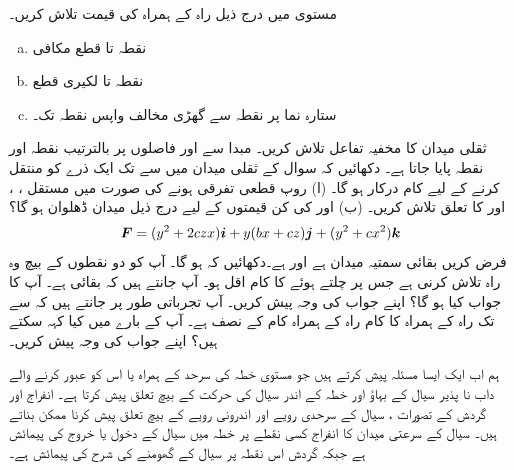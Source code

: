 مستوی  میں درج ذیل راہ  کے ہمراہ  کی قیمت تلاش کریں۔
\begin{enumerate}[a.]
\item
نقطہ  تا  قطع مکافی 
\item
نقطہ  تا  لکیری قطع
\item
ستارہ نما  پر نقطہ  سے گھڑی مخالف واپس نقطہ  تک۔
\end{enumerate}
ثقلی میدان  کا مخفیہ تفاعل تلاش کریں۔
مبدا سے  اور  فاصلوں پر بالترتیب نقطہ  اور  نقطہ  پایا جاتا ہے۔ دکھائیں کہ سوال  کے ثقلی میدان میں  سے  تک ایک ذرے کو منتقل کرنے کے لیے  کام درکار ہو گا۔
(ا) روپ  قطعی تفرقی ہونے کی صورت میں مستقل ،  ، اور    کا تعلق تلاش کریں۔ (ب)  اور  کی کن قیمتوں کے لیے درج ذیل  میدان ڈھلوان ہو گا؟
\[{{\boldsymbol{F}}}=(y^2+2czx){\boldsymbol{i}}+y(bx+cz){\boldsymbol{j}}+(y^2+cx^2){\boldsymbol{k}}\]
فرض کریں  بقائی سمتیہ میدان ہے اور  ہے۔دکھائیں کہ  ہو گا۔
آپ کو دو نقطوں کے بیچ وہ راہ تلاش کرنی ہے جس پر چلتے ہوئے    کا  کام  اقل ہو۔ آپ جانتے ہیں کہ  بقائی ہے۔ آپ کا جواب کیا ہو گا؟ اپنے جواب کی وجہ پیش کریں۔
آپ تجرباتی طور  پر جانتے ہیں کہ  سے  تک راہ  کے ہمراہ  کا کام راہ  کے ہمراہ کام کے نصف ہے۔ آپ  کے بارے میں کیا کہہ سکتے ہیں؟ اپنے جواب کی وجہ پیش کریں۔


ہم اب ایک ایسا مسئلہ پیش کرتے ہیں جو مستوی خطہ  کی سرحد کے ہمراہ یا اس کو عبور کرنے والے  داب نا پذیر سیال کے  بہاؤ اور خطہ کے اندر سیال کی حرکت  کے بیچ تعلق پیش کرتا ہے۔ انفراج  اور گردش  کے تصورات  ، سیال کے سرحدی رویے  اور اندرونی رویے کے بیچ تعلق پیش کرنا ممکن بناتے ہیں۔ سیال کے سرعتی میدان  کا انفراج کسی نقطے پر  خطہ میں سیال کے دخول یا خروج کی پیمائش  ہے جبکہ گردش اس نقطہ پر سیال کے گھومنے کی شرح کی پیمائش ہے۔

